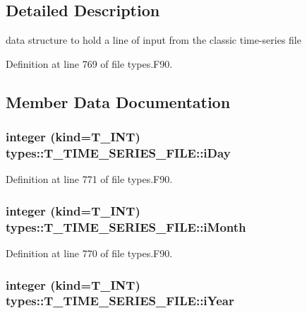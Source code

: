 \subsection{Detailed Description}
data structure to hold a line of input from the classic time-\/series file 

Definition at line 769 of file types.F90.



\subsection{Member Data Documentation}
\hypertarget{typetypes_1_1_t___t_i_m_e___s_e_r_i_e_s___f_i_l_e_a95040eec42351a0517d8233cd7b4c679}{
\subsubsection[{iDay}]{\setlength{\rightskip}{0pt plus 5cm}integer (kind={\bf T\_\-INT}) {\bf types::T\_\-TIME\_\-SERIES\_\-FILE::iDay}}}
\label{typetypes_1_1_t___t_i_m_e___s_e_r_i_e_s___f_i_l_e_a95040eec42351a0517d8233cd7b4c679}


Definition at line 771 of file types.F90.

\hypertarget{typetypes_1_1_t___t_i_m_e___s_e_r_i_e_s___f_i_l_e_a042cf93b0616ab98ea2670e209a25415}{
\subsubsection[{iMonth}]{\setlength{\rightskip}{0pt plus 5cm}integer (kind={\bf T\_\-INT}) {\bf types::T\_\-TIME\_\-SERIES\_\-FILE::iMonth}}}
\label{typetypes_1_1_t___t_i_m_e___s_e_r_i_e_s___f_i_l_e_a042cf93b0616ab98ea2670e209a25415}


Definition at line 770 of file types.F90.

\hypertarget{typetypes_1_1_t___t_i_m_e___s_e_r_i_e_s___f_i_l_e_aaae8992c73e9764ce1e54c77501edb3b}{
\subsubsection[{iYear}]{\setlength{\rightskip}{0pt plus 5cm}integer (kind={\bf T\_\-INT}) {\bf types::T\_\-TIME\_\-SERIES\_\-FILE::iYear}}}
\label{typetypes_1_1_t___t_i_m_e___s_e_r_i_e_s___f_i_l_e_aaae8992c73e9764ce1e54c77501edb3b}


